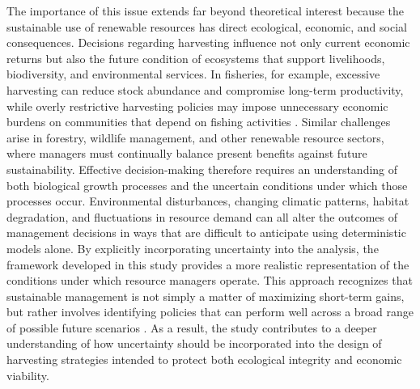 \documentclass[11pt]{article}
\begin{document}
	The importance of this issue extends far beyond theoretical interest because the sustainable use of renewable resources has direct ecological, economic, and social consequences. Decisions regarding harvesting influence not only current economic returns but also the future condition of ecosystems that support livelihoods, biodiversity, and environmental services. In fisheries, for example, excessive harvesting can reduce stock abundance and compromise long-term productivity, while overly restrictive harvesting policies may impose unnecessary economic burdens on communities that depend on fishing activities \citep{khan2024mp60,dasgupta2023frequent,hertweck2023clinicopathological}. Similar challenges arise in forestry, wildlife management, and other renewable resource sectors, where managers must continually balance present benefits against future sustainability. Effective decision-making therefore requires an understanding of both biological growth processes and the uncertain conditions under which those processes occur. Environmental disturbances, changing climatic patterns, habitat degradation, and fluctuations in resource demand can all alter the outcomes of management decisions in ways that are difficult to anticipate using deterministic models alone. By explicitly incorporating uncertainty into the analysis, the framework developed in this study provides a more realistic representation of the conditions under which resource managers operate. This approach recognizes that sustainable management is not simply a matter of maximizing short-term gains, but rather involves identifying policies that can perform well across a broad range of possible future scenarios \citep{pramanik2024estimation,pramanik2023cont}. As a result, the study contributes to a deeper understanding of how uncertainty should be incorporated into the design of harvesting strategies intended to protect both ecological integrity and economic viability.
	
\end{document}
